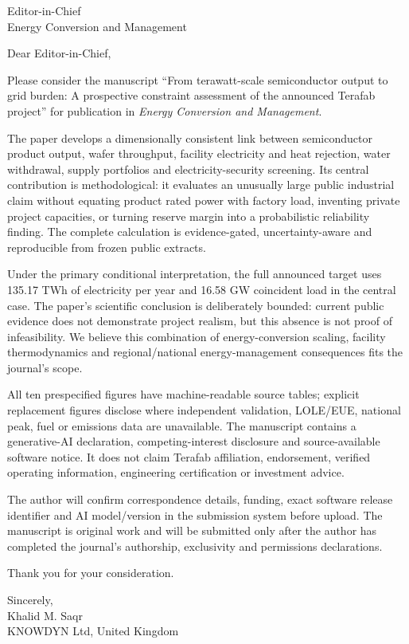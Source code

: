 \documentclass[11pt]{letter}
\date{1 August 2026}
\begin{document}
\begin{letter}{Editor-in-Chief\\Energy Conversion and Management}
\opening{Dear Editor-in-Chief,}

Please consider the manuscript ``From terawatt-scale semiconductor output to
grid burden: A prospective constraint assessment of the announced Terafab
project'' for publication in \emph{Energy Conversion and Management}.

The paper develops a dimensionally consistent link between semiconductor
product output, wafer throughput, facility electricity and heat rejection,
water withdrawal, supply portfolios and electricity-security screening. Its
central contribution is methodological: it evaluates an unusually large
public industrial claim without equating product rated power with factory
load, inventing private project capacities, or turning reserve margin into a
probabilistic reliability finding. The complete calculation is evidence-gated,
uncertainty-aware and reproducible from frozen public extracts.

Under the primary conditional interpretation, the full announced target uses
135.17 TWh of electricity per year and 16.58 GW coincident load in the central case. The
paper's scientific conclusion is deliberately bounded: current public evidence
does not demonstrate project realism, but this absence is not proof of
infeasibility. We believe this combination of energy-conversion scaling,
facility thermodynamics and regional/national energy-management consequences
fits the journal's scope.

All ten prespecified figures have machine-readable source tables; explicit
replacement figures disclose where independent validation, LOLE/EUE, national
peak, fuel or emissions data are unavailable. The manuscript contains a
generative-AI declaration, competing-interest disclosure and source-available
software notice. It does not claim Terafab affiliation, endorsement, verified
operating information, engineering certification or investment advice.

The author will confirm correspondence details, funding, exact software release
identifier and AI model/version in the submission system before upload. The
manuscript is original work and will be submitted only after the author has
completed the journal's authorship, exclusivity and permissions declarations.

Thank you for your consideration.

\medskip
\noindent Sincerely,\\[1.5em]
Khalid M. Saqr\\
KNOWDYN Ltd, United Kingdom
\end{letter}
\end{document}
